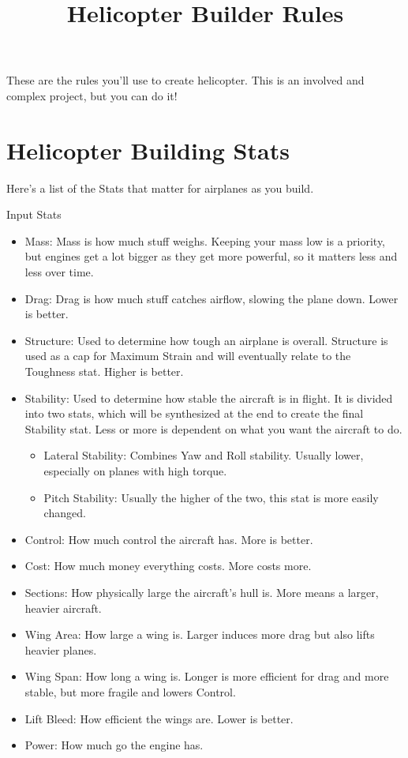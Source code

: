 \documentclass{article}
\title{Helicopter Builder Rules}
\begin{document}
These are the rules you'll use to create helicopter. This is an involved
and complex project, but you can do it!

\section{Helicopter Building Stats}
\label{Helicopter Building Stats}

Here's a list of the Stats that matter for airplanes as you build.

Input Stats

\begin{itemize}
    \item          Mass: Mass is how much stuff weighs. Keeping your mass low is a
          priority, but engines get a lot bigger as they get more powerful, so
          it matters less and less over time.
    \item          Drag: Drag is how much stuff catches airflow, slowing the plane
          down. Lower is better.
    \item          Structure: Used to determine how tough an airplane is overall.
          Structure is used as a cap for Maximum Strain and will eventually
          relate to the Toughness stat. Higher is better.
    \item          Stability: Used to determine how stable the aircraft is in
          flight. It is divided into two stats, which will be synthesized at the
          end to create the final Stability stat. Less or more is dependent on
          what you want the aircraft to do.

          \begin{itemize}
              \item                    Lateral Stability: Combines Yaw and Roll stability. Usually
                    lower, especially on planes with high torque.
              \item                    Pitch Stability: Usually the higher of the two, this stat is
                    more easily changed.
          \end{itemize}
\end{itemize}

\begin{itemize}
    \item          Control: How much control the aircraft has. More is better.
    \item          Cost: How much money everything costs. More costs more.
    \item          Sections: How physically large the aircraft's hull is. More
          means a larger, heavier aircraft.
    \item          Wing Area: How large a wing is. Larger induces more drag but
          also lifts heavier planes.
    \item          Wing Span: How long a wing is. Longer is more efficient for
          drag and more stable, but more fragile and lowers Control.
    \item          Lift Bleed: How efficient the wings are. Lower is better.
    \item          Power: How much go the engine has.
\end{itemize}
\end{document}
